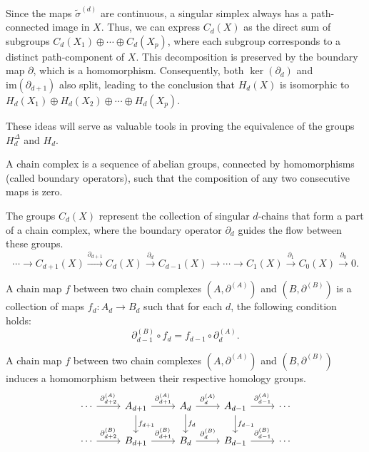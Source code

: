 Since the maps $\tilde{\sigma}^{(d)}$ are continuous, a singular simplex always has a path-connected image in $X$. Thus, we can express $C_d(X)$ as the direct sum of subgroups $C_d(X_1) \oplus \cdots \oplus C_d(X_p)$, where each subgroup corresponds to a distinct path-component of $X$. This decomposition is preserved by the boundary map $\partial$, which is a homomorphism. Consequently, both $\ker(\partial_d)$ and $\mathrm{im}(\partial_{d+1})$ also split, leading to the conclusion that $H_d(X)$ is isomorphic to $H_d(X_1) \oplus H_d(X_2) \oplus \cdots \oplus H_d(X_p)$.

These ideas will serve as valuable tools in proving the equivalence of the groups $H_d^\Delta$ and $H_d$.

\begin{definition}
A chain complex is a sequence of abelian groups, connected by homomorphisms (called boundary operators), such that the composition of any two consecutive maps is zero.
\end{definition}

\begin{example}
The groups $C_d(X)$ represent the collection of singular $d$-chains that form a part of a chain complex, where the boundary operator $\partial_d$ guides the flow between these groups.
\begin{equation*}
\cdots \xrightarrow{} C_{d+1}(X) \xrightarrow{\partial_{d+1}} C_d(X) \xrightarrow{\partial_d} C_{d-1}(X) \xrightarrow{} \cdots \xrightarrow{} C_1(X) \xrightarrow{\partial_1} C_0(X) \xrightarrow{\partial_0} 0.
\end{equation*}
\end{example}

\begin{definition}
A chain map $f$ between two chain complexes $(A, \partial^{(A)})$ and $(B,\partial^{(B)})$ is a collection of maps $f_d: A_d \rightarrow B_d$ such that for each $d$, the following condition holds:
\begin{equation*}
\partial^{(B)}_{d-1} \circ f_d = f_{d-1} \circ \partial^{(A)}_d.
\end{equation*}
\end{definition}

\begin{theorem}
\label{chainmaps}
A chain map $f$ between two chain complexes $(A, \partial^{(A)})$ and $(B, \partial^{(B)})$ induces a homomorphism between their respective homology groups.
\begin{equation*}
\begin{tikzcd}
\cdots \arrow[r, "\partial^{(A)}_{d+2}"] & A_{d+1} \arrow[r, "\partial^{(A)}_{d+1}"] \arrow[d, "f_{d+1}"] & A_d \arrow[r, "\partial^{(A)}_{d}"] \arrow[d, "f_d"] & A_{d-1} \arrow[r, "\partial^{(A)}_{d-1}"] \arrow[d, "f_{d-1}"] & \cdots \\
\cdots \arrow[r, "\partial^{(B)}_{d+2}"] & B_{d+1} \arrow[r, "\partial^{(B)}_{d+1}"]                                  & B_d \arrow[r, "\partial^{(B)}_d"]                              & B_{d-1} \arrow[r, "\partial^{(B)}_{d-1}"]                                  & \cdots
\end{tikzcd}
\end{equation*}
\end{theorem}

